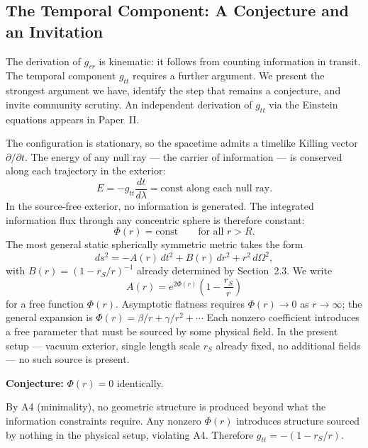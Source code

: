 \documentclass[12pt]{article}
\begin{document}
\subsection{The Temporal Component: A Conjecture and an Invitation}
\label{sec:gtt}

The derivation of $g_{rr}$ is kinematic: it follows from counting
information in transit.
The temporal component $g_{tt}$ requires a further argument.
We present the strongest argument we have, identify the step that
remains a conjecture, and invite community scrutiny.
An independent derivation of $g_{tt}$ via the Einstein equations
appears in Paper~II.

The configuration is stationary, so the spacetime admits a timelike
Killing vector $\partial/\partial t$.
The energy of any null ray --- the carrier of information --- is
conserved along each trajectory in the exterior:
\begin{equation}
  E = -g_{tt}\frac{dt}{d\lambda} = \text{const along each null ray.}
  \label{eq:killing-energy}
\end{equation}
In the source-free exterior, no information is generated.
The integrated information flux through any concentric sphere is
therefore constant:
\begin{equation}
  \Phi(r) = \text{const} \qquad \text{for all } r > R.
  \label{eq:flux-conservation}
\end{equation}
The most general static spherically symmetric metric takes the form
\cite{Wald1984}
\begin{equation}
  ds^2 = -A(r)\,dt^2 + B(r)\,dr^2 + r^2\,d\Omega^2,
  \label{eq:metric-general}
\end{equation}
with $B(r) = (1 - r_S/r)^{-1}$ already determined by Section~2.3.
We write
\begin{equation}
  A(r) = e^{2\Phi(r)}\left(1 - \frac{r_S}{r}\right)
  \label{eq:Ar}
\end{equation}
for a free function $\Phi(r)$.
Asymptotic flatness requires $\Phi(r) \to 0$ as $r \to \infty$;
the general expansion is $\Phi(r) = \beta/r + \gamma/r^2 + \cdots$
Each nonzero coefficient introduces a free parameter that must be
sourced by some physical field.
In the present setup --- vacuum exterior, single length scale $r_S$
already fixed, no additional fields --- no such source is present.

\medskip
\noindent\textbf{Conjecture:} $\Phi(r) = 0$ identically.

\medskip
By A4 (minimality), no geometric structure is produced beyond what
the information constraints require.
Any nonzero $\Phi(r)$ introduces structure sourced by nothing in the
physical setup, violating A4.
Therefore $g_{tt} = -(1 - r_S/r)$.
\end{document}

